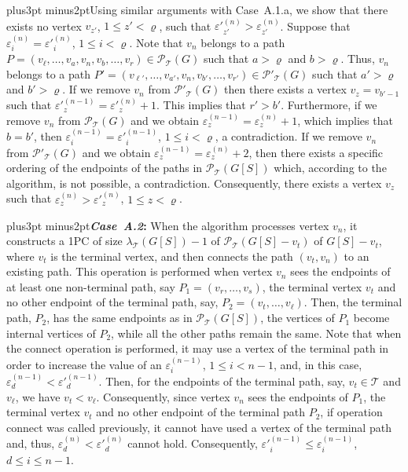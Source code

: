 \documentclass[10pt]{article}
\def\yskip{\penalty-50\vskip3pt plus3pt minus2pt}
\def\y{\yskip}
\begin{document}
{\y Using similar arguments with Case~A.1.a, we show that there
exists no vertex $v_{z'}$, $1 \leq z' <\varrho$, such that
$\varepsilon'^{(n)}_{z'}>\varepsilon^{(n)}_{z'}$. Suppose that
$\varepsilon^{(n)}_i=\varepsilon'^{(n)}_i$, $1 \leq i <\varrho$.
Note that $v_n$ belongs to a path $P=(v_\ell, \ldots, v_a, v_n,
v_b, \ldots, v_r) \in \mathcal{P_{\mathcal{T}}}(G)$ such that
$a>\varrho$ and $b>\varrho$. Thus, $v_n$ belongs to a path
$P'=(v_{\ell'}, \ldots, v_{a'}, v_n, v_{b'}, \ldots, v_{r'}) \in
\mathcal{P'_{\mathcal{T}}}(G)$ such that $a'>\varrho$ and
$b'>\varrho$. If we remove $v_n$ from
$\mathcal{P'_{\mathcal{T}}}(G)$ then there exists a vertex
$v_z=v_{b'-1}$ such that
$\varepsilon'^{(n-1)}_z=\varepsilon'^{(n)}_z+1$. This implies that
$r'>b'$. Furthermore, if we remove $v_n$ from
$\mathcal{P_{\mathcal{T}}}(G)$ and we obtain
$\varepsilon^{(n-1)}_z=\varepsilon^{(n)}_z+1$, which implies that
$b=b'$, then $\varepsilon^{(n-1)}_i=\varepsilon'^{(n-1)}_i$, $1
\leq i <\varrho$, a contradiction. If we remove $v_n$ from
$\mathcal{P'_{\mathcal{T}}}(G)$ and we obtain
$\varepsilon^{(n-1)}_z=\varepsilon^{(n)}_z+2$, then there exists a
specific ordering of the endpoints of the paths in
$\mathcal{P_{\mathcal{T}}}(G[S])$ which, according to the
algorithm, is not possible, a contradiction. Consequently, there
exists a vertex $v_z$ such that $\varepsilon^{(n)}_z >
\varepsilon'^{(n)}_z$, $1 \leq z < \varrho$.

\y {\bf \textit{Case~A.2}:} When the algorithm processes vertex
$v_n$, it constructs a 1PC of size $\lambda_\mathcal{T}(G[S])-1$
of $\mathcal{P_{\mathcal{T}}}(G[S]-v_t)$ of $G[S]-v_t$, where
$v_t$ is the terminal vertex, and then connects the path $(v_t,
v_n)$ to an existing path. This operation is performed when vertex
$v_n$ sees the endpoints of at least one non-terminal path, say
$P_1=(v_r, \ldots, v_s)$, the terminal vertex $v_t$ and no other
endpoint of the terminal path, say, $P_2=(v_t, \ldots, v_\ell)$.
Then, the terminal path, $P_2$, has the same endpoints as in
$\mathcal{P_{\mathcal{T}}}(G[S])$, the vertices of $P_1$ become
internal vertices of $P_2$, while all the other paths remain the
same. Note that when the connect operation is performed, it may
use a vertex of the terminal path in order to increase the value
of an $\varepsilon^{(n-1)}_i$, $1 \leq i < n-1$, and, in this
case, $\varepsilon^{(n-1)}_d<\varepsilon'^{(n-1)}_d$. Then, for
the endpoints of the terminal path, say, $v_t \in \mathcal{T}$ and
$v_\ell$, we have $v_t<v_\ell$. Consequently, since vertex $v_n$
sees the endpoints of $P_1$, the terminal vertex $v_t$ and no
other endpoint of the terminal path $P_2$, if operation connect
was called previously, it cannot have used a vertex of the
terminal path and, thus,
$\varepsilon^{(n)}_d<\varepsilon'^{(n)}_d$ cannot hold.
Consequently, $\varepsilon'^{(n-1)}_i \leq \varepsilon^{(n-1)}_i$,
$d \leq i \leq n-1$.

}
\end{document}
